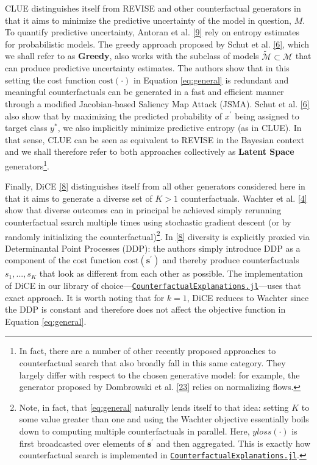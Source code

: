 \documentclass[conference,final,]{IEEEtran}
\theoremstyle{definition}
\theoremstyle{definition}
\theoremstyle{definition}
\theoremstyle{definition}
\theoremstyle{remark}
\begin{document}
CLUE distinguishes itself from REVISE and other counterfactual generators in that it aims to minimize the predictive uncertainty of the model in question, \(M\). To quantify predictive uncertainty, Antoran et al. \protect\hyperlink{ref-antoran2020getting}{{[}9{]}} rely on entropy estimates for probabilistic models. The greedy approach proposed by Schut et al. \protect\hyperlink{ref-schut2021generating}{{[}6{]}}, which we shall refer to as \textbf{Greedy}, also works with the subclass of models \(\tilde{\mathcal{M}}\subset\mathcal{M}\) that can produce predictive uncertainty estimates. The authors show that in this setting the cost function \(\text{cost}(\cdot)\) in Equation \eqref{eq:general} is redundant and meaningful counterfactuals can be generated in a fast and efficient manner through a modified Jacobian-based Saliency Map Attack (JSMA). Schut et al. \protect\hyperlink{ref-schut2021generating}{{[}6{]}} also show that by maximizing the predicted probability of \(x^\prime\) being assigned to target class \(y^*\), we also implicitly minimize predictive entropy (as in CLUE). In that sense, CLUE can be seen as equivalent to REVISE in the Bayesian context and we shall therefore refer to both approaches collectively as \textbf{Latent Space} generators\footnote{In fact, there are a number of other recently proposed approaches to counterfactual search that also broadly fall in this same category. They largely differ with respect to the chosen generative model: for example, the generator proposed by Dombrowski et al. \protect\hyperlink{ref-dombrowski2021diffeomorphic}{{[}23{]}} relies on normalizing flows.}.

Finally, DiCE \protect\hyperlink{ref-mothilal2020explaining}{{[}8{]}} distinguishes itself from all other generators considered here in that it aims to generate a diverse set of \(K>1\) counterfactuals. Wachter et al. \protect\hyperlink{ref-wachter2017counterfactual}{{[}4{]}} show that diverse outcomes can in principal be achieved simply rerunning counterfactual search multiple times using stochastic gradient descent (or by randomly initializing the counterfactual)\footnote{Note, in fact, that \eqref{eq:general} naturally lends itself to that idea: setting \(K\) to some value greater than one and using the Wachter objective essentially boils down to computing multiple counterfactuals in parallel. Here, \(yloss(\cdot)\) is first broadcasted over elements of \(\mathbf{s}^\prime\) and then aggregated. This is exactly how counterfactual search is implemented in \href{https://github.com/pat-alt/CounterfactualExplanations.jl}{\texttt{CounterfactualExplanations.jl}}.}. In \protect\hyperlink{ref-mothilal2020explaining}{{[}8{]}} diversity is explicitly proxied via Determinantal Point Processes (DDP): the authors simply introduce DDP as a component of the cost function \(\text{cost}(\mathbf{s}^\prime)\) and thereby produce counterfactuals \(s_1, ... , s_K\) that look as different from each other as possible. The implementation of DiCE in our library of choice---\href{https://github.com/pat-alt/CounterfactualExplanations.jl}{\texttt{CounterfactualExplanations.jl}}---uses that exact approach. It is worth noting that for \(k=1\), DiCE reduces to Wachter since the DDP is constant and therefore does not affect the objective function in Equation \eqref{eq:general}.
\end{document}
